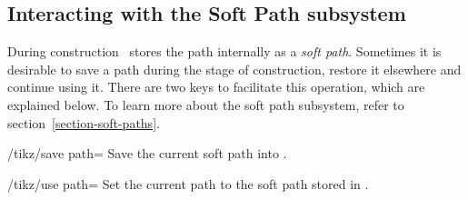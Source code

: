 \subsection{Interacting with the Soft Path subsystem}

During construction \tikzname\ stores the path internally as a \emph{soft
path}. Sometimes it is desirable to save a path during the stage of
construction, restore it elsewhere and continue using it. There are two keys to
facilitate this operation, which are explained below. To learn more about the
soft path subsystem, refer to section~\ref{section-soft-paths}.

\begin{key}{/tikz/save path=}
    Save the current soft path into .
\end{key}

\begin{key}{/tikz/use path=}
    Set the current path to the soft path stored in .
\end{key}

\begin{codeexample}[preamble={\usetikzlibrary{intersections}}]
\end{codeexample}
